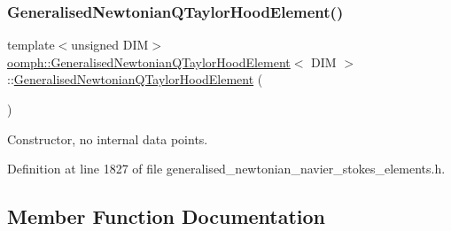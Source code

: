 \subsubsection{\texorpdfstring{Generalised\+Newtonian\+Q\+Taylor\+Hood\+Element()}{GeneralisedNewtonianQTaylorHoodElement()}}
{\footnotesize\ttfamily template$<$unsigned D\+IM$>$ \\
\hyperlink{classoomph_1_1GeneralisedNewtonianQTaylorHoodElement}{oomph\+::\+Generalised\+Newtonian\+Q\+Taylor\+Hood\+Element}$<$ D\+IM $>$\+::\hyperlink{classoomph_1_1GeneralisedNewtonianQTaylorHoodElement}{Generalised\+Newtonian\+Q\+Taylor\+Hood\+Element} (\begin{DoxyParamCaption}{ }\end{DoxyParamCaption})\hspace{0.3cm}{\ttfamily [inline]}}



Constructor, no internal data points. 



Definition at line 1827 of file generalised\+\_\+newtonian\+\_\+navier\+\_\+stokes\+\_\+elements.\+h.



\subsection{Member Function Documentation}
\mbox{\label{classoomph_1_1GeneralisedNewtonianQTaylorHoodElement_a631eefcbaebe7c2a3e9c2128c0fa0f6b}} 
